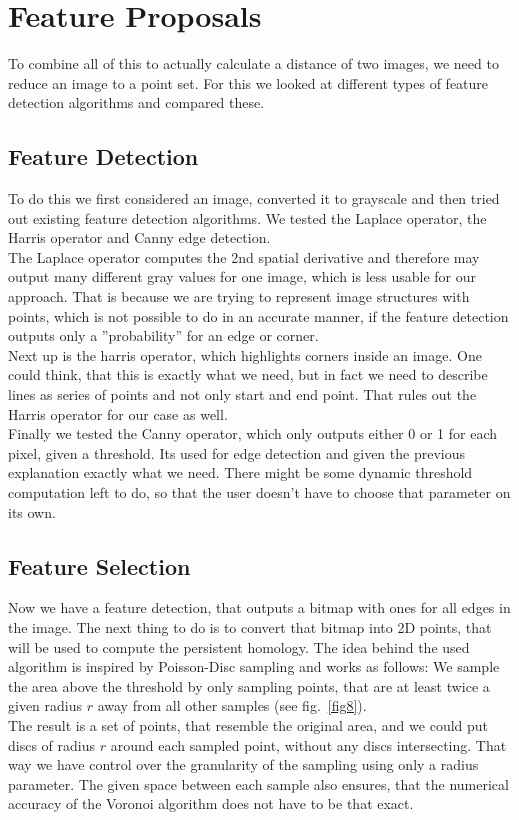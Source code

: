 \documentclass[11pt, a4paper, UKenglish]{article}
\begin{document}
    \section{Feature Proposals}\label{sec:feature-proposals2}
    To combine all of this to actually calculate a distance of two images, we need to reduce an image to a point set.
    For this we looked at different types of feature detection algorithms and compared these.
    \subsection{Feature Detection}\label{subsec:feature-detection}
    To do this we first considered an image, converted it to grayscale and then tried out existing feature detection algorithms.
    We tested the Laplace operator, the Harris operator and Canny edge detection.\\
    The Laplace operator computes the 2nd spatial derivative and therefore may output many different gray values for one image, which is less usable for our approach.
    That is because we are trying to represent image structures with points, which is not possible to do in an accurate manner, if the feature detection outputs only a ''probability'' for an edge or corner.\\
    Next up is the harris operator, which highlights corners inside an image.
    One could think, that this is exactly what we need, but in fact we need to describe lines as series of points and not only start and end point.
    That rules out the Harris operator for our case as well.
    \\
    Finally we tested the Canny operator, which only outputs either 0 or 1 for each pixel, given a threshold.
    Its used for edge detection and given the previous explanation exactly what we need.
    There might be some dynamic threshold computation left to do, so that the user doesn't have to choose that parameter on its own.
    \subsection{Feature Selection}\label{subsec:feature-selection}
    Now we have a feature detection, that outputs a bitmap with ones for all edges in the image.
    The next thing to do is to convert that bitmap into 2D points, that will be used to compute the persistent homology.
    The idea behind the used algorithm is inspired by Poisson-Disc sampling and works as follows:
    We sample the area above the threshold by only sampling points, that are at least twice a given radius $r$ away from all other samples (see fig.~\ref{fig8}).\\
    The result is a set of points, that resemble the original area, and we could put discs of radius $r$ around each sampled point, without any discs intersecting.
    That way we have control over the granularity of the sampling using only a radius parameter.
    The given space between each sample also ensures, that the numerical accuracy of the Voronoi algorithm does not have to be that exact.
\end{document}
